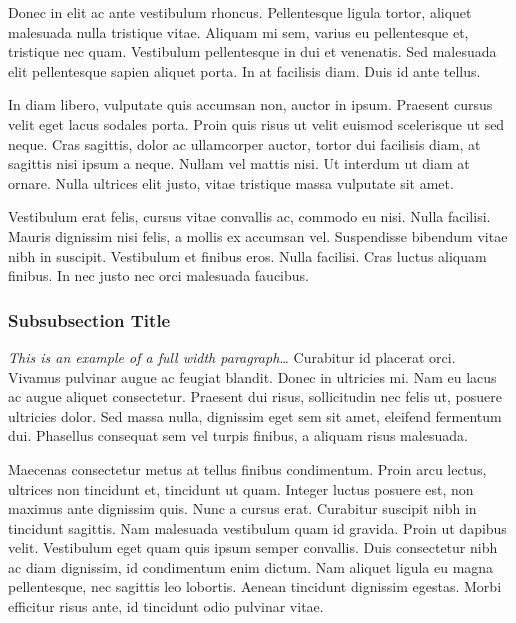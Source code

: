 \documentclass[
	a4paper, %
	12pt, %
]{include/CSSullivanBusinessReport}
\begin{document}
Donec in elit ac ante vestibulum rhoncus. Pellentesque ligula tortor, aliquet malesuada nulla tristique vitae. Aliquam mi sem, varius eu pellentesque et, tristique nec quam. Vestibulum pellentesque in dui et venenatis. Sed malesuada elit pellentesque sapien aliquet porta. In at facilisis diam. Duis id ante tellus. %

In diam libero, vulputate quis accumsan non, auctor in ipsum. Praesent cursus velit eget lacus sodales porta. Proin quis risus ut velit euismod scelerisque ut sed neque. Cras sagittis, dolor ac ullamcorper auctor, tortor dui facilisis diam, at sagittis nisi ipsum a neque. Nullam vel mattis nisi. Ut interdum ut diam at ornare. Nulla ultrices elit justo, vitae tristique massa vulputate sit amet.

\nonumsidenote{
	}Vestibulum erat felis, cursus vitae convallis ac, commodo eu nisi. Nulla facilisi. Mauris dignissim nisi felis, a mollis ex accumsan vel. Suspendisse bibendum vitae nibh in suscipit. Vestibulum et finibus eros. Nulla facilisi. Cras luctus aliquam finibus. In nec justo nec orci malesuada faucibus.

\subsubsection{Subsubsection Title} %

\begin{fullwidth} %
	\textit{This is an example of a full width paragraph\ldots} Curabitur id placerat orci. Vivamus pulvinar augue ac feugiat blandit. Donec in ultricies mi. Nam eu lacus ac augue aliquet consectetur. Praesent dui risus, sollicitudin nec felis ut, posuere ultricies dolor. Sed massa nulla, dignissim eget sem sit amet, eleifend fermentum dui. Phasellus consequat sem vel turpis finibus, a aliquam risus malesuada.
\end{fullwidth}

Maecenas consectetur metus at tellus finibus condimentum. Proin arcu lectus, ultrices non tincidunt et, tincidunt ut quam. Integer luctus posuere est, non maximus ante dignissim quis. Nunc a cursus erat. Curabitur suscipit nibh in tincidunt sagittis. Nam malesuada vestibulum quam id gravida. Proin ut dapibus velit. Vestibulum eget quam quis ipsum semper convallis. Duis consectetur nibh ac diam dignissim, id condimentum enim dictum. Nam aliquet ligula eu magna pellentesque, nec sagittis leo lobortis. Aenean tincidunt dignissim egestas. Morbi efficitur risus ante, id tincidunt odio pulvinar vitae.
\end{document}
